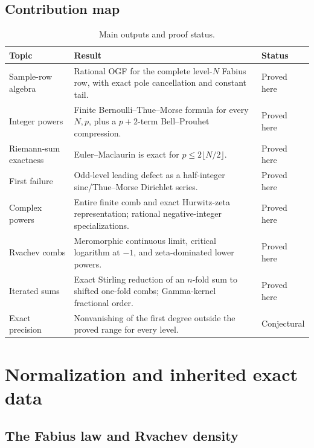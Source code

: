 \documentclass[11pt,oneside]{article}
\numberwithin{equation}{section}
\theoremstyle{definition}
\theoremstyle{remark}
\begin{document}
\subsection{Contribution map}

\begin{table}[H]
\centering
\small
\begin{tabularx}{\textwidth}{@{}p{}X p{}@{}}
\toprule
Topic & Result & Status \\
\midrule
Sample-row algebra & Rational OGF for the complete level-\(N\) Fabius row, with exact
pole cancellation and constant tail. & Proved here \\
Integer powers & Finite Bernoulli--Thue--Morse formula for every \(N,p\), plus a
\(p+2\)-term Bell--Prouhet compression. & Proved here \\
Riemann-sum exactness & Euler--Maclaurin is exact for
\(p\le2\lfloor N/2\rfloor\). & Proved here \\
First failure & Odd-level leading defect as a half-integer sinc/Thue--Morse Dirichlet
series. & Proved here \\
Complex powers & Entire finite comb and exact Hurwitz-zeta representation; rational
negative-integer specializations. & Proved here \\
Rvachev combs & Meromorphic continuous limit, critical logarithm at \(-1\), and
zeta-dominated lower powers. & Proved here \\
Iterated sums & Exact Stirling reduction of an \(n\)-fold sum to shifted one-fold combs;
Gamma-kernel fractional order. & Proved here \\
Exact precision & Nonvanishing of the first degree outside the proved range for every
level. & Conjectural \\
\bottomrule
\end{tabularx}
\caption{Main outputs and proof status.}
\label{tab:contribution-map}
\end{table}

\section{Normalization and inherited exact data}
\label{sec:background}

\subsection{The Fabius law and Rvachev density}
\end{document}
